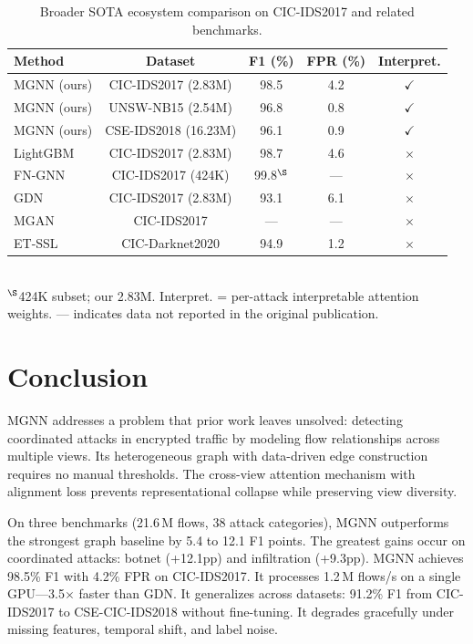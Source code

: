 \documentclass[conference]{IEEEtran}
\begin{document}
\begin{table}[t]
\caption{Broader SOTA ecosystem comparison on CIC-IDS2017 and related benchmarks.}
\label{tab:ecosystem}
\centering
\scriptsize
\begin{tabular}{lcccc}
\toprule
Method & Dataset & F1 (\%) & FPR (\%) & Interpret. \\
\midrule
MGNN (ours) & CIC-IDS2017 (2.83M) & 98.5 & 4.2 & $\checkmark$ \\
MGNN (ours) & UNSW-NB15 (2.54M) & 96.8 & 0.8 & $\checkmark$ \\
MGNN (ours) & CSE-IDS2018 (16.23M) & 96.1 & 0.9 & $\checkmark$ \\
\midrule
LightGBM~\cite{chen2016xgboost} & CIC-IDS2017 (2.83M) & 98.7 & 4.6 & $\times$ \\
FN-GNN~\cite{tran2024fngnn} & CIC-IDS2017 (424K) & 99.8$^\S$ & --- & $\times$ \\
GDN~\cite{zheng2022gdn} & CIC-IDS2017 (2.83M) & 93.1 & 6.1 & $\times$ \\
MGAN~\cite{akpaku2025mgan} & CIC-IDS2017 & --- & --- & $\times$ \\
\midrule
ET-SSL~\cite{sattar2025etssl} & CIC-Darknet2020 & 94.9 & 1.2 & $\times$ \\
\bottomrule
\end{tabular}
\vspace{3pt}\\
{\footnotesize $^\S$424K subset; our 2.83M. Interpret. = per-attack interpretable attention weights. --- indicates data not reported in the original publication.}
\end{table}


\section{Conclusion}

MGNN addresses a problem that prior work leaves unsolved: detecting coordinated attacks in encrypted traffic by modeling flow relationships across multiple views. Its heterogeneous graph with data-driven edge construction requires no manual thresholds. The cross-view attention mechanism with alignment loss prevents representational collapse while preserving view diversity.

On three benchmarks (21.6\,M flows, 38 attack categories), MGNN outperforms the strongest graph baseline by 5.4 to 12.1 F1 points. The greatest gains occur on coordinated attacks: botnet (+12.1pp) and infiltration (+9.3pp). MGNN achieves 98.5\% F1 with 4.2\% FPR on CIC-IDS2017. It processes 1.2\,M flows/s on a single GPU---3.5$\times$ faster than GDN. It generalizes across datasets: 91.2\% F1 from CIC-IDS2017 to CSE-CIC-IDS2018 without fine-tuning. It degrades gracefully under missing features, temporal shift, and label noise.
\end{document}
